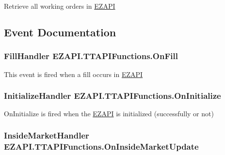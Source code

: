 Retrieve all working orders in \hyperlink{namespace_e_z_a_p_i}{E\-Z\-A\-P\-I} 



\subsection{Event Documentation}
\hypertarget{class_e_z_a_p_i_1_1_t_t_a_p_i_functions_a89427d6aa5c073e4eae6857f65e0fe40}{
\subsubsection[{On\-Fill}]{\setlength{\rightskip}{0pt plus 5cm}Fill\-Handler E\-Z\-A\-P\-I.\-T\-T\-A\-P\-I\-Functions.\-On\-Fill}}\label{class_e_z_a_p_i_1_1_t_t_a_p_i_functions_a89427d6aa5c073e4eae6857f65e0fe40}


This event is fired when a fill occurs in \hyperlink{namespace_e_z_a_p_i}{E\-Z\-A\-P\-I} 

\hypertarget{class_e_z_a_p_i_1_1_t_t_a_p_i_functions_aa3e534f11319b72732f54427aabcaddf}{
\subsubsection[{On\-Initialize}]{\setlength{\rightskip}{0pt plus 5cm}Initialize\-Handler E\-Z\-A\-P\-I.\-T\-T\-A\-P\-I\-Functions.\-On\-Initialize}}\label{class_e_z_a_p_i_1_1_t_t_a_p_i_functions_aa3e534f11319b72732f54427aabcaddf}


On\-Initialize is fired when the \hyperlink{namespace_e_z_a_p_i}{E\-Z\-A\-P\-I} is initialized (successfully or not) 

\hypertarget{class_e_z_a_p_i_1_1_t_t_a_p_i_functions_a61d320755a386fecd0db718af12325e8}{
\subsubsection[{On\-Inside\-Market\-Update}]{\setlength{\rightskip}{0pt plus 5cm}Inside\-Market\-Handler E\-Z\-A\-P\-I.\-T\-T\-A\-P\-I\-Functions.\-On\-Inside\-Market\-Update}}\label{class_e_z_a_p_i_1_1_t_t_a_p_i_functions_a61d320755a386fecd0db718af12325e8}


